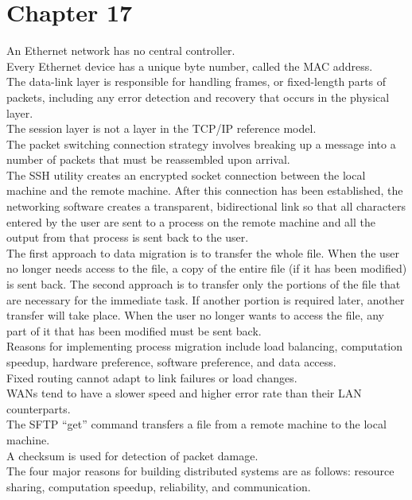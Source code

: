 \documentclass[12pt]{article}
\begin{document}
\section*{\centering Chapter 17}
An Ethernet network has no central controller.\\[2mm]
Every Ethernet device has a unique byte number, called the MAC address.\\[2mm]
The data-link layer is responsible for handling frames, or fixed-length parts of packets, including any error detection and recovery that occurs in the physical layer.\\[2mm]
The session layer is not a layer in the TCP/IP reference model.\\[2mm]
The packet switching connection strategy involves breaking up a message into a number of packets that must be reassembled upon arrival.\\[2mm]
The SSH utility creates an encrypted socket connection between the local machine and the remote machine. After this connection has been established, the networking software creates a transparent, bidirectional link so that all characters entered by the user are sent to a process on the remote machine and all the output from that process is sent back to the user.\\[2mm]
The first approach to data migration is to transfer the whole file. When the user no longer needs access to the file, a copy of the entire file (if it has been modified) is sent back. The second approach is to transfer only the portions of the file that are necessary for the immediate task. If another portion is required later, another transfer will take place. When the user no longer wants to access the file, any part of it that has been modified must be sent back.\\[2mm]
Reasons for implementing process migration include load balancing, computation speedup, hardware preference, software preference, and data access.\\[2mm]
Fixed routing cannot adapt to link failures or load changes.\\[2mm]
WANs tend to have a slower speed and higher error rate than their LAN counterparts.\\[2mm]
The SFTP ``get'' command transfers a file from a remote machine to the local machine.\\[2mm]
A checksum is used for detection of packet damage.\\[2mm]
The four major reasons for building distributed systems are as follows: resource sharing, computation speedup, reliability, and communication.\\[2mm]
\end{document}

